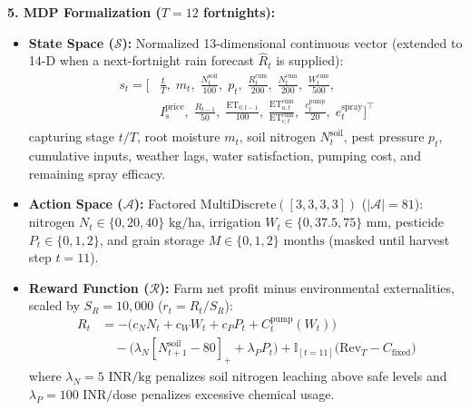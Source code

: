 \documentclass[10pt,twocolumn]{article}
\begin{document}
\textbf{5. MDP Formalization ($T=12$ fortnights):}
\begin{itemize}
    \item \textbf{State Space ($\mathcal{S}$):} Normalized 13-dimensional continuous vector (extended to 14-D when a next-fortnight rain forecast $\hat{R}_t$ is supplied):
    \begin{equation}
    \begin{aligned}
    s_t = \Big[
    &\tfrac{t}{T},\; m_t,\; \tfrac{N^{\text{soil}}_t}{100},\; p_t,\; \tfrac{R^{\text{cum}}_t}{200},\; \tfrac{N^{\text{cum}}_t}{200},\; \tfrac{W^{\text{cum}}_t}{500},\\
    &I^{\text{price}}_s,\; \tfrac{R_{t-1}}{50},\; \tfrac{\text{ET}_{0,t-1}}{100},\; \tfrac{\text{ET}^{\text{cum}}_{a,t}}{\text{ET}^{\text{cum}}_{c,t}},\; \tfrac{c^{\text{pump}}_t}{20},\; e^{\text{spray}}_t
    \Big]^\top
    \end{aligned}
    \end{equation}
    capturing stage $t/T$, root moisture $m_t$, soil nitrogen $N^{\text{soil}}_t$, pest pressure $p_t$, cumulative inputs, weather lags, water satisfaction, pumping cost, and remaining spray efficacy.
    \item \textbf{Action Space ($\mathcal{A}$):} Factored $\text{MultiDiscrete}([3, 3, 3, 3])$ ($|\mathcal{A}|=81$): nitrogen $N_t \in \{0, 20, 40\}\text{ kg/ha}$, irrigation $W_t \in \{0, 37.5, 75\}\text{ mm}$, pesticide $P_t \in \{0, 1, 2\}$, and grain storage $M \in \{0, 1, 2\}\text{ months}$ (masked until harvest step $t=11$).
    \item \textbf{Reward Function ($\mathcal{R}$):} Farm net profit minus environmental externalities, scaled by $S_R = 10{,}000$ ($r_t = R_t / S_R$):
    \begin{equation}
    \begin{aligned}
    R_t &= -\big(c_N N_t + c_W W_t + c_P P_t + C^{\text{pump}}_t(W_t)\big) \\
    &\quad -\big(\lambda_N [N^{\text{soil}}_{t+1} - 80]_+ + \lambda_P P_t\big) + \mathbb{I}_{[t = 11]}\big(\text{Rev}_T - C_{\text{fixed}}\big)
    \end{aligned}
    \end{equation}
    where $\lambda_N = 5\text{ INR/kg}$ penalizes soil nitrogen leaching above safe levels and $\lambda_P = 100\text{ INR/dose}$ penalizes excessive chemical usage.
\end{itemize}

\end{document}
